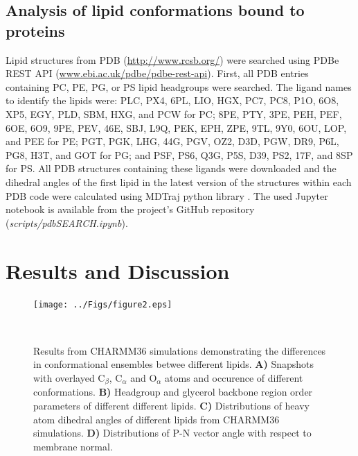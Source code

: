 \documentclass[aps,prl,superscriptaddress,twocolumn]{revtex4}
\begin{document}
\subsection{Analysis of lipid conformations bound to proteins}
Lipid structures from PDB (\url{http://www.rcsb.org/})
were searched using PDBe REST API (\url{www.ebi.ac.uk/pdbe/pdbe-rest-api}).
First, all PDB entries containing PC, PE, PG, or PS lipid headgroups were searched.
The ligand names to identify the lipids were:
PLC, PX4, 6PL, LIO, HGX, PC7, PC8, P1O, 6O8, XP5, EGY, PLD, SBM, HXG, and PCW for PC;
8PE, PTY, 3PE, PEH, PEF, 6OE, 6O9, 9PE, PEV, 46E, SBJ, L9Q, PEK, EPH, ZPE, 9TL, 9Y0, 6OU, LOP, and PEE for PE;
PGT, PGK, LHG, 44G, PGV, OZ2, D3D, PGW, DR9, P6L, PG8, H3T, and GOT for PG; and
PSF, PS6, Q3G, P5S, D39, PS2, 17F, and 8SP for PS.
All PDB structures containing these ligands were downloaded and the dihedral angles of
the first lipid in the latest version of the structures within each PDB code were calculated  
using MDTraj python library \cite{mcgibbon15}.
The used Jupyter notebook is available from the project's GitHub repository ({\it scripts/pdbSEARCH.ipynb}).



\section{Results and Discussion}


\begin{figure}[]
  \centering
   \texttt{[image: ../Figs/figure2.eps]}
   \caption{\label{structures}
     Results from CHARMM36 simulations demonstrating the differences in conformational ensembles betwee different lipids. 
     {\bf A)} Snapshots with overlayed C$_\beta$, C$_\alpha$ and O$_\alpha$ atoms and occurence of different conformations.
     {\bf B)} Headgroup and glycerol backbone region order parameters of different different lipids.
     {\bf C)} Distributions of heavy atom dihedral angles of different lipids from CHARMM36 simulations.
     {\bf D)} Distributions of P-N vector angle with respect to membrane normal.
  }
   \\
\end{figure}
\end{document}
